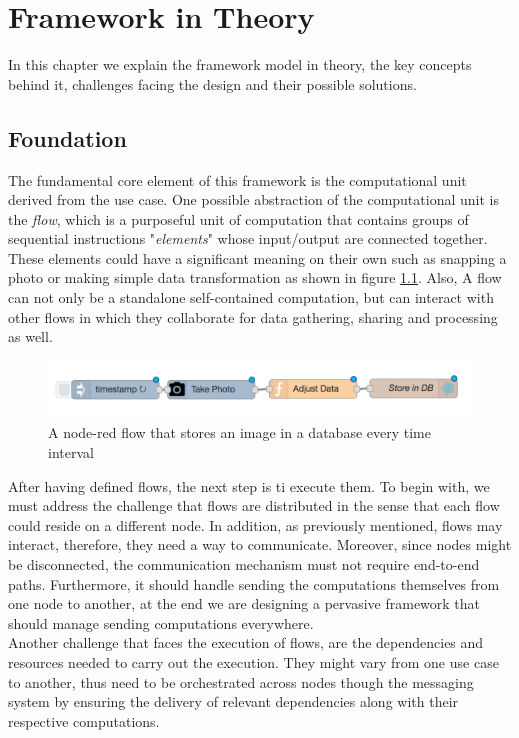 
\chapter{Framework in Theory}\label{chapter:Foundation}
In this chapter we explain the framework model in theory, the key concepts behind it, challenges facing the design and their possible solutions.


\section{Foundation}
	The fundamental core element of this framework is the computational unit derived from the use case. One possible abstraction of the computational unit is the \textit{flow}, which is a purposeful unit of computation that contains groups of sequential instructions "\textit{elements}" whose input/output are connected together. These elements could have a significant meaning on their own such as snapping a photo or making simple data transformation as shown in figure \ref{fig:flow}. Also, A flow can not only be a standalone self-contained computation, but can interact with other flows in which they collaborate for data gathering, sharing and processing as well.
	
	
\begin{figure}[H]
	\centering
	\includegraphics[scale=0.5]{images/db-out.png} 
	\caption{A node-red flow that stores an image in a database every time interval}
	\label{fig:flow}
\end{figure}

After having defined flows, the next step is ti execute them. To begin with, we must address the challenge that flows are distributed in the sense that each flow could reside on a different node. In addition, as previously mentioned, flows may interact, therefore, they need a way to communicate. Moreover, since nodes might be disconnected,  the communication mechanism must not require end-to-end paths. Furthermore, it  should handle sending the computations themselves from one node to another, at the end we are designing a pervasive framework that should manage sending computations everywhere.\\

\noindent Another challenge that faces the execution of  flows, are the dependencies and resources needed to carry out the execution.
 They might vary from one use case to another, thus need to be orchestrated across nodes though the messaging system by  ensuring the delivery of relevant dependencies along with their respective computations.\\
 
